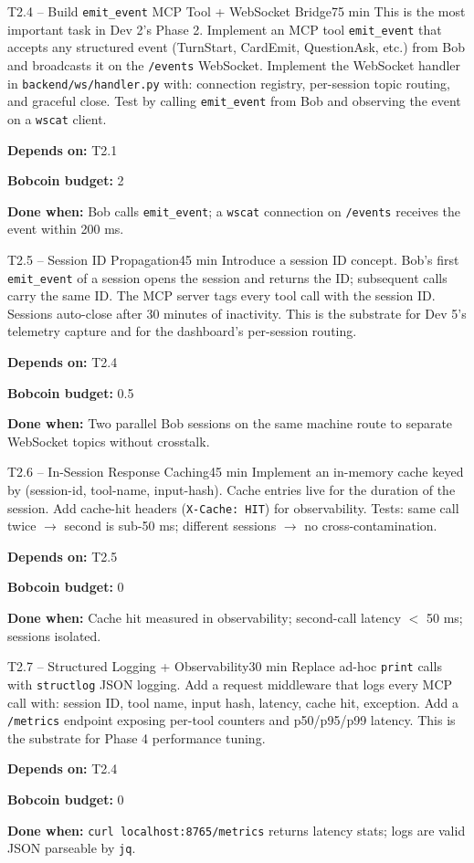 \documentclass[11pt,letterpaper]{article}
\newcommand{\acceptance}[1]{\par\smallskip\textcolor{ibmgreen}{\textbf{Done when:}} #1}
\newcommand{\depends}[1]{\par\smallskip\textcolor{ibmorange}{\textbf{Depends on:}} #1}
\newcommand{\bobcost}[1]{\par\smallskip\textcolor{ibmaccent}{\textbf{Bobcoin budget:}} #1}
\begin{document}
\begin{task}{T2.4 -- Build \texttt{emit\_event} MCP Tool + WebSocket Bridge}{75 min}
This is the most important task in Dev 2's Phase 2. Implement an MCP tool \texttt{emit\_event} that accepts any structured event (TurnStart, CardEmit, QuestionAsk, etc.) from Bob and broadcasts it on the \texttt{/events} WebSocket. Implement the WebSocket handler in \texttt{backend/ws/handler.py} with: connection registry, per-session topic routing, and graceful close. Test by calling \texttt{emit\_event} from Bob and observing the event on a \texttt{wscat} client.
\depends{T2.1}
\bobcost{2}
\acceptance{Bob calls \texttt{emit\_event}; a \texttt{wscat} connection on \texttt{/events} receives the event within 200 ms.}
\end{task}

\begin{task}{T2.5 -- Session ID Propagation}{45 min}
Introduce a session ID concept. Bob's first \texttt{emit\_event} of a session opens the session and returns the ID; subsequent calls carry the same ID. The MCP server tags every tool call with the session ID. Sessions auto-close after 30 minutes of inactivity. This is the substrate for Dev 5's telemetry capture and for the dashboard's per-session routing.
\depends{T2.4}
\bobcost{0.5}
\acceptance{Two parallel Bob sessions on the same machine route to separate WebSocket topics without crosstalk.}
\end{task}

\begin{task}{T2.6 -- In-Session Response Caching}{45 min}
Implement an in-memory cache keyed by (session-id, tool-name, input-hash). Cache entries live for the duration of the session. Add cache-hit headers (\texttt{X-Cache: HIT}) for observability. Tests: same call twice $\rightarrow$ second is sub-50 ms; different sessions $\rightarrow$ no cross-contamination.
\depends{T2.5}
\bobcost{0}
\acceptance{Cache hit measured in observability; second-call latency $<$ 50 ms; sessions isolated.}
\end{task}

\begin{task}{T2.7 -- Structured Logging + Observability}{30 min}
Replace ad-hoc \texttt{print} calls with \texttt{structlog} JSON logging. Add a request middleware that logs every MCP call with: session ID, tool name, input hash, latency, cache hit, exception. Add a \texttt{/metrics} endpoint exposing per-tool counters and p50/p95/p99 latency. This is the substrate for Phase 4 performance tuning.
\depends{T2.4}
\bobcost{0}
\acceptance{\texttt{curl localhost:8765/metrics} returns latency stats; logs are valid JSON parseable by \texttt{jq}.}
\end{task}
\end{document}
